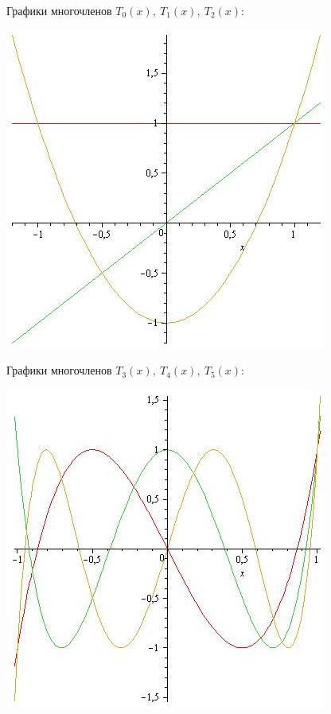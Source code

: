 \documentclass[12pt]{article}
\begin{document}
	Графики многочленов $T_0(x),~ T_1(x),~ T_2(x)$:\begin{center}
		\includegraphics[scale=0.5]{T0T1T2.jpg} \end{center}
	Графики многочленов $T_3(x),~ T_4(x),~ T_5(x)$:\begin{center}
		\includegraphics[scale=0.5]{T3T4T5.jpg} \end{center}	
\end{document}
